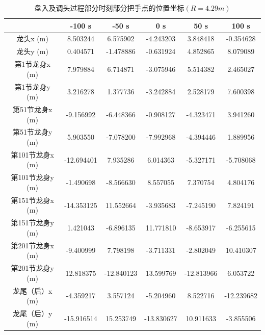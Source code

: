 \documentclass[withoutpreface,bwprint]{cumcmthesis} %
\begin{document}
\begin{table}[!htbp]
    \centering
    \caption{盘入及调头过程部分时刻部分把手点的位置坐标$(R=4.29m)$}
    \label{table7}
    \begin{tabular}{cccccc}
        \toprule[2pt]
        ~ &-100 s & -50 s & 0 s & 50 s & 100 s \\ 
        \midrule[1pt]
        龙头x (m) & 8.503244  & 6.575902  & -4.243203  & 3.848418  & -0.354628  \\ 
        龙头y (m) & 0.404571  & -1.478886  & -0.631924  & 4.852865  & 8.079089  \\ 
        第1节龙身x (m) & 7.979884  & 6.714871  & -3.075946  & 5.514382  & 2.465027  \\
        第1节龙身y (m) & 3.216278  & 1.377736  & -3.242884  & 2.528179  & 7.600398  \\ 
        第51节龙身x (m) & -9.156992  & -6.448366  & -0.908127  & -4.323471  & 3.941260  \\ 
        第51节龙身y (m) & 5.903550  & -7.078200  & -7.992968  & -4.394446  & 1.889956  \\ 
        第101节龙身x (m) & -12.694401  & 7.935286  & 6.014363  & -5.327171  & -5.708068  \\
        第101节龙身y (m) & -1.490698  & -8.566630  & 8.557055  & 7.370754  & 4.804176  \\
        第151节龙身x (m) & -14.353125  & 11.552664  & -3.935683  & -7.245190  & 7.824191  \\ 
        第151节龙身y (m) & 1.421043  & -6.896135  & 11.771810  & -8.653917  & -6.255615  \\
        第201节龙身x (m) & -9.400999  & 7.798198  & -3.711331  & -2.802049  & 10.410307  \\
        第201节龙身y (m) & 12.818375  & -12.840123  & 13.599769  & -12.813966  & 6.053722  \\
        龙尾（后）x (m) & -4.359217  & 3.557124  & -5.204960  & 8.522716  & -12.239682  \\
        龙尾（后）y (m) & -15.916514  & 15.253749  & -13.830627  & 10.911633  & -3.855506 \\
        \bottomrule[2pt]
    \end{tabular}
\end{table}
\end{document}
